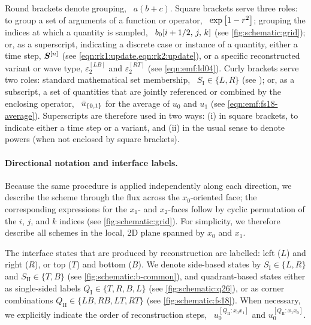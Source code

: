 Round brackets denote grouping, \eg~$a(b+c)$. Square brackets serve three roles: to group a set of arguments of a function or operator, \eg~$\exp\left[ 1 - r^2 \right]$; grouping the indices at which a quantity is sampled, \eg~$b_0\!\left[ i+1/2,\,j,\,k \right]$ (see \cref{fig:schematic:grid}); or, as a superscript, indicating a discrete case or instance of a quantity, either a time step, $\bm{S}^{[n]}$ (see \cref{eqn:rk1:update,eqn:rk2:update}), or a specific reconstructed variant or wave type, $\varepsilon_2^{[LB]}$ and $\varepsilon_2^{[RT]}$ (see \cref{eqn:emf:ld04}). Curly brackets serve two roles: standard mathematical set membership, \eg~$S_\mathrm{I} \in \{L, R\}$ (see ); or, as a subscript, a set of quantities that are jointly referenced or combined by the enclosing operator, \eg~$\bar{u}_{\left\{ 0,1 \right\}}$ for the average of $u_0$ and $u_1$ (see \cref{eqn:emf:fs18-average}). Superscripts are therefore used in two ways: (i) in square brackets, to indicate either a time step or a variant, and (ii) in the usual sense to denote powers (when not enclosed by square brackets).

\paragraph*{Directional notation and interface labels.}

Because the same procedure is applied independently along each direction, we describe the scheme through the flux across the $x_0$-oriented face; the corresponding expressions for the $x_1$- and $x_2$-faces follow by cyclic permutation of the $i$, $j$, and $k$ indices (see \cref{fig:schematic:grid}). For simplicity, we therefore describe all schemes in the local, 2D plane spanned by $x_0$ and $x_1$.

The interface states that are produced by reconstruction are labelled: left ($L$) and right ($R$), or top ($T$) and bottom ($B$). We denote side-based states by $S_\mathrm{I} \in \{L, R\}$ and $S_\mathrm{II} \in \{T, B\}$ (see \cref{fig:schematic:b-common}), and quadrant-based states either as single-sided labels $Q_\mathrm{I} \in \{T, R, B, L\}$ (see \cref{fig:schematic:q26}), or as corner combinations $Q_\mathrm{II} \in \{LB, RB, LT, RT\}$ (see \cref{fig:schematic:fs18}). When necessary, we explicitly indicate the order of reconstruction steps, \eg~$u_0^{[Q_\mathrm{II}: x_0 x_1]}$ and $u_0^{[Q_\mathrm{II}: x_1 x_0]}$.
